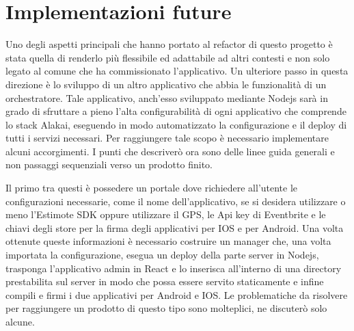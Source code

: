 \chapter{Implementazioni future}
\label{cha:intro}
\vspace{5mm}

Uno degli aspetti principali che hanno portato al refactor di questo progetto è stata quella di renderlo più flessibile ed adattabile ad altri contesti e non solo legato al comune che ha commissionato l’applicativo. Un ulteriore passo in questa direzione è lo sviluppo di un altro applicativo che abbia le funzionalità di un orchestratore. Tale applicativo, anch'esso sviluppato mediante Nodejs sarà in grado di sfruttare a pieno l’alta configurabilità di ogni applicativo che comprende lo stack Alakai, eseguendo in modo automatizzato la configurazione e il deploy di tutti i servizi necessari. Per raggiungere tale scopo è necessario implementare alcuni accorgimenti. I punti che descriverò ora sono delle linee guida generali e non passaggi sequenziali verso un prodotto finito.\vspace{5mm}

Il primo tra questi è possedere un portale dove richiedere all’utente le configurazioni necessarie, come il nome dell’applicativo, se si desidera utilizzare o meno l’Estimote SDK oppure utilizzare il GPS, le Api key di Eventbrite e le chiavi degli store per la firma degli applicativi per IOS e per Android. Una volta ottenute queste informazioni è necessario costruire un manager che, una volta importata la configurazione, esegua un deploy della parte server in Nodejs, trasponga l’applicativo admin in React e lo inserisca all’interno di una directory prestabilita sul server in modo che possa essere servito staticamente e infine compili e firmi i due applicativi per Android e IOS. Le problematiche da risolvere per raggiungere un prodotto di questo tipo sono molteplici, ne discuterò solo alcune.\vspace{5mm}

